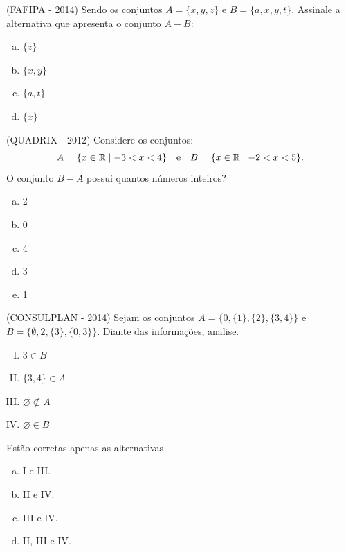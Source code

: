 \begin{exer}
 (FAFIPA - 2014) Sendo os conjuntos $A = \{ x,y,z \}$ e $B =  \{a, x,y,t\}$. Assinale a alternativa que apresenta o conjunto $A - B$:
 \begin{multicols}{5}
 \begin{enumerate}[a)]
  \item $\{ z \}$
  \item $\{ x, y \}$
  \item $\{a, t\}$
  \item  $\{x\}$
 \end{enumerate}
 \end{multicols}
\end{exer}

\begin{exer}
(QUADRIX - 2012) Considere os conjuntos:
\begin{equation}
 A = \{ x \in \R \mid - 3 < x < 4 \} \ \ \text{ e } \ \ B = \{ x \in \R \mid - 2 < x < 5 \}.
\end{equation}
 O conjunto $B - A$ possui quantos números inteiros?
 \begin{multicols}{5}
 \begin{enumerate}[a)]
  \item 2
  \item 0
  \item 4
  \item 3
  \item 1
 \end{enumerate}
 \end{multicols}
 \end{exer}

\begin{exer}
 (CONSULPLAN - 2014) Sejam os conjuntos $A = \{0, \{1\}, \{2\}, \{3, 4\}\}$ e $B = \{\emptyset, 2, \{3\}, \{0, 3\}\}$. Diante das informações, analise.
 \begin{multicols}{2}
 \begin{enumerate}[I)]
  \item $3 \in B$
  \item $\{3, 4\} \in A$
  \item $\varnothing \not\subset A$
  \item $\varnothing \in B$
 \end{enumerate}
 \end{multicols}
 Estão corretas apenas as alternativas
 \begin{multicols}{2}
 \begin{enumerate}[a)]
 \item I e III.
 \item II e IV.
 \item III e IV.
 \item II, III e IV.
 \end{enumerate}
 \end{multicols}
\end{exer}

